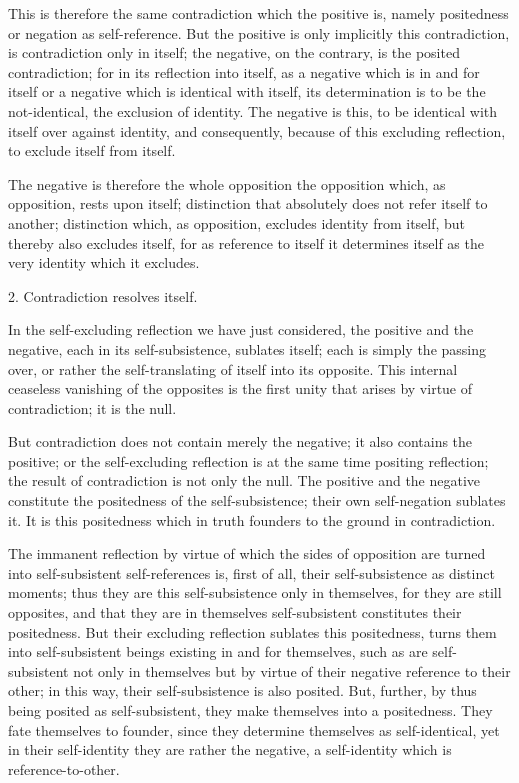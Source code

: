 This is therefore the same contradiction which the positive is,
namely positedness or negation as self-reference.
But the positive is only implicitly this contradiction,
is contradiction only in itself;
the negative, on the contrary, is the posited contradiction;
for in its reflection into itself,
as a negative which is in and for itself
or a negative which is identical with itself,
its determination is to be the not-identical,
the exclusion of identity.
The negative is this,
to be identical with itself over against identity,
and consequently, because of this excluding reflection,
to exclude itself from itself.

The negative is therefore the whole opposition
the opposition which, as opposition, rests upon itself;
distinction that absolutely does not refer itself to another;
distinction which, as opposition, excludes identity from itself,
but thereby also excludes itself,
for as reference to itself it determines itself
as the very identity which it excludes.

2. Contradiction resolves itself.

In the self-excluding reflection
we have just considered,
the positive and the negative,
each in its self-subsistence,
sublates itself;
each is simply the passing over,
or rather the self-translating of itself into its opposite.
This internal ceaseless vanishing of the opposites is
the first unity that arises by virtue of contradiction;
it is the null.

But contradiction does not contain merely the negative;
it also contains the positive;
or the self-excluding reflection is
at the same time positing reflection;
the result of contradiction is not only the null.
The positive and the negative constitute
the positedness of the self-subsistence;
their own self-negation sublates it.
It is this positedness which in truth
founders to the ground in contradiction.

The immanent reflection by virtue of which
the sides of opposition are turned into
self-subsistent self-references is,
first of all, their self-subsistence as distinct moments;
thus they are this self-subsistence only in themselves,
for they are still opposites,
and that they are in themselves self-subsistent
constitutes their positedness.
But their excluding reflection
sublates this positedness,
turns them into self-subsistent beings
existing in and for themselves,
such as are self-subsistent not only in themselves
but by virtue of their negative reference to their other;
in this way, their self-subsistence is also posited.
But, further, by thus being posited as self-subsistent,
they make themselves into a positedness.
They fate themselves to founder,
since they determine themselves as self-identical,
yet in their self-identity they are rather the negative,
a self-identity which is reference-to-other.

